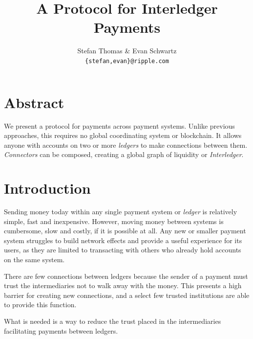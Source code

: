 \documentclass[letterpaper,twocolumn,10pt]{article}
\begin{document}
\date{}

\title{\Large \bf A Protocol for Interledger Payments}

\author{
\textnormal{Stefan Thomas \& Evan Schwartz} \\
\textnormal{\texttt{\{stefan,evan\}@ripple.com}}
}

\maketitle

\thispagestyle{empty}

\section*{Abstract}

We present a protocol for payments across payment systems. Unlike previous approaches, this requires no global coordinating system or blockchain. It allows anyone with accounts on two or more \textit{ledgers} to make connections between them. \textit{Connectors} can be composed, creating a global graph of liquidity or \mbox{\textit{Interledger}}.


\section{Introduction}


Sending money today within any single payment system or \textit{ledger} is relatively simple, fast and inexpensive. However, moving money between systems is cumbersome, slow and costly, if it is possible at all. Any new or smaller payment system struggles to build network effects and provide a useful experience for its users, as they are limited to transacting with others who already hold accounts on the same system.

There are few connections between ledgers because the sender of a payment must trust the intermediaries not to walk away with the money. This presents a high barrier for creating new connections, and a select few trusted institutions are able to provide this function.

What is needed is a way to reduce the trust placed in the intermediaries facilitating payments between ledgers.
\end{document}

